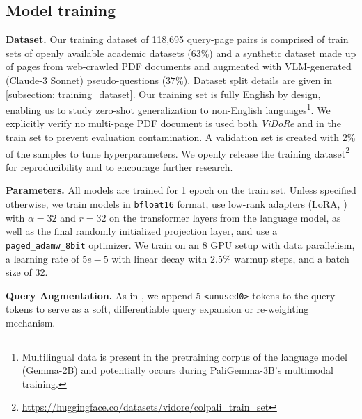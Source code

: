 \documentclass{article} %
\newcommand{\code}[1]{\texttt{#1}}
\begin{document}



\subsection{Model training}

\noindent\textbf{Dataset.} Our training dataset of 118,695 query-page pairs is comprised of train sets of openly available academic datasets ($63\%$) and a synthetic dataset made up of pages from web-crawled PDF documents and augmented with VLM-generated (Claude-3 Sonnet) pseudo-questions ($37\%$). Dataset split details are given in \autoref{subsection: training_dataset}.
Our training set is fully English by design, enabling us to study zero-shot generalization to non-English languages\footnote{Multilingual data is present in the pretraining corpus of the language model (Gemma-2B) and potentially occurs during PaliGemma-3B's multimodal training.}. We explicitly verify no multi-page PDF document is used both \textit{ViDoRe} and in the train set to prevent evaluation contamination. A validation set is created with $2\%$ of the samples to tune hyperparameters. We openly release the training dataset\footnote{\url{https://huggingface.co/datasets/vidore/colpali_train_set}} for reproducibility and to encourage further research. 

\noindent\textbf{Parameters.} All models are trained for 1 epoch on the train set. Unless specified otherwise, we train models in \code{bfloat16} format, use low-rank adapters (LoRA, \citet{hu_lora_2021}) with $\alpha=32 $ and $r=32$ on the transformer layers from the language model, as well as the final randomly initialized projection layer, and use a \code{paged\_adamw\_8bit} optimizer. We train on an 8 GPU setup with data parallelism, a learning rate of $5e-5$ with linear decay with 2.5\% warmup steps, and a batch size of 32.


\noindent\textbf{Query Augmentation.} As in \citet{khattab_colbert_2020}, we append 5 \code{<unused0>} tokens to the query tokens to serve as a soft, differentiable query expansion or re-weighting mechanism. 
\end{document}
